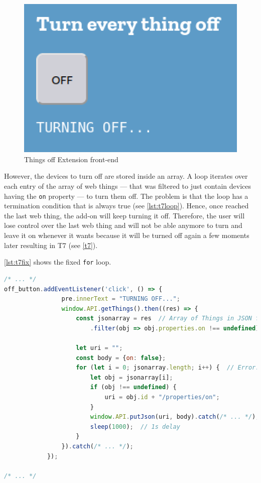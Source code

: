 \begin{figure}[H]
    \centering
    \includegraphics[scale=0.75]{images/addons/things-off.png}
    \caption{Things off Extension front-end}
    \label{fig:t7fe}
\end{figure}

However, the devices to turn off are stored inside an array. A loop iterates over each entry of the array of \glspl{web thing} --- that was filtered to just contain devices having the \texttt{on} property --- to turn them off. The problem is that the loop has a termination condition that is always true (see \autoref{lst:t7loop}). Hence, once reached the last \gls{web thing}, the add-on will keep turning it off. Therefore, the user will lose control over the last \gls{web thing} and will not be able anymore to turn and leave it on whenever it wants because it will be turned off again a few moments later resulting in T7 (see \autoref{t7}).

\autoref{lst:t7fix} shows the fixed \texttt{for} loop.

\begin{lstlisting}[language=JavaScript, label=lst:t7loop, caption=T7 - Turning off loop]
/* ... */
off_button.addEventListener('click', () => {
                pre.innerText = "TURNING OFF...";
                window.API.getThings().then((res) => {
                    const jsonarray = res  // Array of Things in JSON format
                        .filter(obj => obj.properties.on !== undefined);
        
                    let uri = "";
                    const body = {on: false};
                    for (let i = 0; jsonarray.length; i++) {  // Error: no termination condition
                        let obj = jsonarray[i];          
                        if (obj !== undefined) {
                            uri = obj.id + "/properties/on";
                        }
                        window.API.putJson(uri, body).catch(/* ... */);
                        sleep(1000);  // 1s delay
                    }
                }).catch(/* ... */);
            });

/* ... */
\end{lstlisting}


